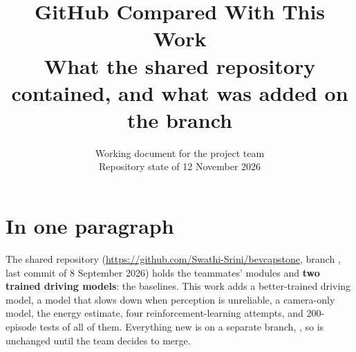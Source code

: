\documentclass[11pt,a4paper]{article}
\title{\textbf{GitHub Compared With This Work}\\[4pt]
\large What the shared repository contained, and what was added on the branch \code{swathi-research-results}}
\author{Working document for the project team\\ Repository state of 12 November 2026}
\date{}
\begin{document}
\maketitle

\section{In one paragraph}
\begin{plainwords}
The shared repository (\url{https://github.com/Swathi-Srini/bevcapstone}, branch , last commit  of 8 September 2026) holds the teammates' modules and \textbf{two trained driving models}: the baselines. This work adds a better-trained driving model, a model that slows down when perception is unreliable, a camera-only model, the energy estimate, four reinforcement-learning attempts, and 200-episode tests of all of them. Everything new is on a separate branch, , so  is unchanged until the team decides to merge.
\end{plainwords}
\end{document}
